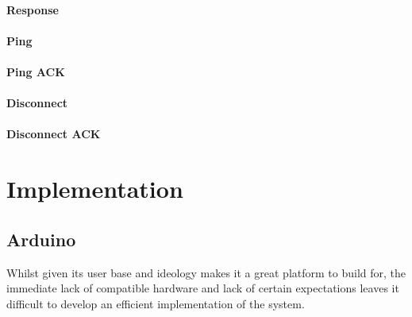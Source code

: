 \documentclass{l4proj}
\begin{document}

\subsubsection{Response} %
\label{ssub:response}


\subsubsection{Ping} %
\label{ssub:ping}


\subsubsection{Ping ACK} %
\label{ssub:ping_ack}


\subsubsection{Disconnect} %
\label{ssub:disconnect}


\subsubsection{Disconnect ACK} %
\label{ssub:disconnect_ack}











\chapter{Implementation} %
\label{cha:implementation}

\section{Arduino} %
\label{sec:arduino}
Whilst given its user base and ideology makes it a great platform to build for, the immediate lack of compatible hardware and lack of certain expectations leaves it difficult to develop an efficient implementation of the system.
\end{document}
